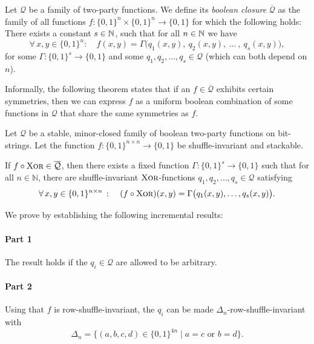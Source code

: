 \documentclass{article}
\begin{document}
\begin{boxdefinition}
    Let $\mathcal{Q}$ be a family of two-party functions. We define its \emph{boolean closure} $\overline{\mathcal{Q}}$ as the family of all functions $f\colon\{0,1\}^n\times\{0,1\}^n\to\{0,1\}$ for which the following holds: There exists a constant $s\in\mathbb{N}$, such that for all $n\in\mathbb{N}$ we have
    \[
        \forall\, x,y\in\{0,1\}^n:\quad
        f(x,y) = \Gamma\big(q_1(x,y),\ q_2(x,y),\ \dots\ ,\ q_s(x,y)\big),
    \]
    for some $\Gamma:\{0,1\}^s\to\{0,1\}$ and some $q_1,q_2,\dots,q_s\in \mathcal{Q}$ (which can both depend on $n$).
\end{boxdefinition}

Informally, the following theorem states that if an $f\in\overline{\mathcal{Q}}$ exhibits certain symmetries, then we can express $f$ as a uniform boolean combination of some functions in $\mathcal{Q}$ that share the same symmetries as $f$.

\begin{boxtheorem}\label{thm:query-inv}
    Let $\mathcal{Q}$ be a stable, minor-closed family of boolean two-party functions on bit-strings. Let the function $f\colon \{0,1\}^{n\times n} \to \{0,1\}$ be shuffle-invariant and stackable.
    
    If $f\circ \operatorname{\textsc{Xor}}\in \overline{\mathcal{Q}}$, then there exists a fixed function $\Gamma\colon \{0,1\}^s\to \{0,1\}$ such that for all $n\in\mathbb{N}$, there are shuffle-invariant $\operatorname{\textsc{Xor}}$-functions $q_1,q_2, \dots, q_s \in \mathcal{Q}$ satisfying
    \[
        \forall\, x,y\in \{0,1\}^{n\times n}\ \colon\quad
        (f\circ \operatorname{\textsc{Xor}})(x,y) = \Gamma\big(q_1(x,y), \dots, q_s(x,y)\big).
    \]
\end{boxtheorem}

We prove  by establishing the following incremental results:

\paragraph{Part 1}
The result holds if the $q_i\in \mathcal{Q}$ are allowed to be arbitrary. 

\paragraph{Part 2}
Using that $f$ is row-shuffle-invariant, the $q_i$ can be made $\Delta_n$-row-shuffle-invariant with
\[
    \Delta_n = \{(a,b,c,d) \in \{0,1\}^{4n}\mid a = c \text { or } b = d\}.
\]
\end{document}
